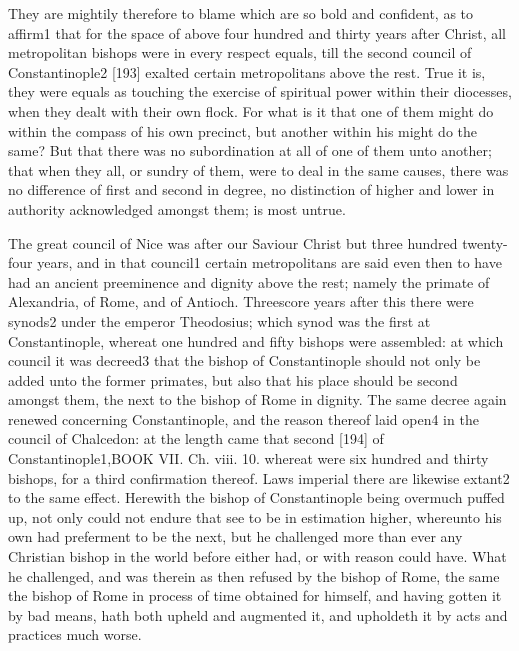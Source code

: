 They are mightily therefore to blame which are so bold and confident, as to affirm1 that for the space of above four hundred and thirty years after Christ, all metropolitan bishops were in every respect equals, till the second council of Constantinople2 [193] exalted certain metropolitans above the rest. True it is, they were equals as touching the exercise of spiritual power within their diocesses, when they dealt with their own flock. For what is it that one of them might do within the compass of his own precinct, but another within his might do the same? But that there was no subordination at all of one of them unto another; that when they all, or sundry of them, were to deal in the same causes, there was no difference of first and second in degree, no distinction of higher and lower in authority acknowledged amongst them; is most untrue.

The great council of Nice was after our Saviour Christ but three hundred twenty-four years, and in that council1 certain metropolitans are said even then to have had an ancient preeminence and dignity above the rest; namely the primate of Alexandria, of Rome, and of Antioch. Threescore years after this there were synods2 under the emperor Theodosius; which synod was the first at Constantinople, whereat one hundred and fifty bishops were assembled: at which council it was decreed3 that the bishop of Constantinople should not only be added unto the former primates, but also that his place should be second amongst them, the next to the bishop of Rome in dignity. The same decree again renewed concerning Constantinople, and the reason thereof laid open4 in the council of Chalcedon: at the length came that second [194] of Constantinople1,BOOK VII. Ch. viii. 10. whereat were six hundred and thirty bishops, for a third confirmation thereof. Laws imperial there are likewise extant2 to the same effect. Herewith the bishop of Constantinople being overmuch puffed up, not only could not endure that see to be in estimation higher, whereunto his own had preferment to be the next, but he challenged more than ever any Christian bishop in the world before either had, or with reason could have. What he challenged, and was therein as then refused by the bishop of Rome, the same the bishop of Rome in process of time obtained for himself, and having gotten it by bad means, hath both upheld and augmented it, and upholdeth it by acts and practices much worse.

